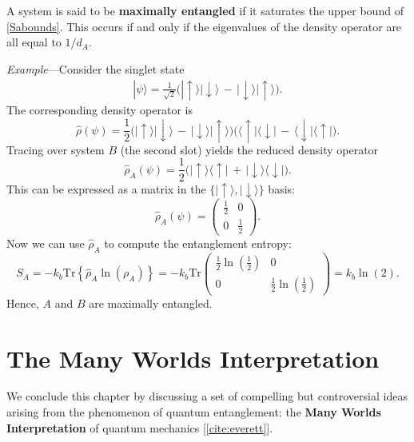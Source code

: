 \documentclass[pra,12pt]{revtex4-2}
\begin{document}
A system is said to be \textbf{maximally entangled} if it saturates
the upper bound of \eqref{Sabounds}.  This occurs if and only if the
eigenvalues of the density operator are all equal to $1/d_A$.

\begin{framed}
\noindent
\textit{Example}---Consider the singlet state
\begin{align}
  |\psi\rangle = \frac{1}{\sqrt{2}} \Big(|\!\uparrow\rangle|\!\downarrow\rangle \,-\, |\!\downarrow\rangle|\!\uparrow\rangle\Big).
\end{align}
The corresponding density operator is
\begin{equation}
  \hat{\rho}(\psi) = \frac{1}{2} \Big(|\!\uparrow\rangle|\!\downarrow\rangle \,-\, |\!\downarrow\rangle|\!\uparrow\rangle\Big) \Big(\langle\uparrow\!|\langle\downarrow\!| \,-\, \langle\downarrow\!|\langle\uparrow\!|\Big).
\end{equation}
Tracing over system $B$ (the second slot) yields the reduced density operator
\begin{equation}
  \hat{\rho}_A(\psi) = \frac{1}{2} \Big(|\!\uparrow\rangle \langle\uparrow\!| \,+\, |\!\downarrow\rangle \langle\downarrow\!|\Big).
\end{equation}
This can be expressed as a matrix in the
$\{|\!\uparrow\rangle,|\!\downarrow\rangle\}$ basis:
\begin{equation}
  \hat{\rho}_A(\psi) = \begin{pmatrix}\frac{1}{2} & 0 \\ 0 & \frac{1}{2}\end{pmatrix}.
\end{equation}
Now we can use $\hat{\rho}_A$ to compute the entanglement entropy:
\begin{equation}
  S_A = -k_b\mathrm{Tr}\left\{\hat{\rho}_A\ln(\rho_A)\right\} = -k_b\mathrm{Tr}\begin{pmatrix}\frac{1}{2}\ln\left(\frac{1}{2}\right) & 0 \\ 0 & \frac{1}{2}\ln\left(\frac{1}{2}\right)\end{pmatrix} = k_b\ln(2).
\end{equation}
Hence, $A$ and $B$ are maximally entangled.
\end{framed}

\section{The Many Worlds Interpretation}

We conclude this chapter by discussing a set of compelling but
controversial ideas arising from the phenomenon of quantum
entanglement: the \textbf{Many Worlds Interpretation} of quantum
mechanics [\ref{cite:everett}].
\end{document}
